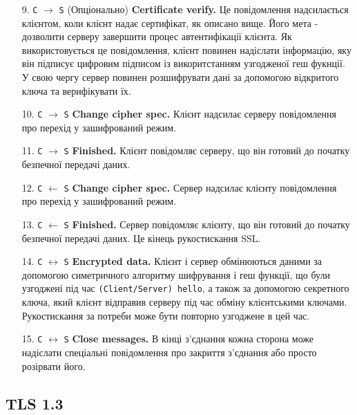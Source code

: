 \begin{enumerate}
    \item[9. \texttt{С} $\longrightarrow$ \texttt{S}] (Опціонально) \textbf{Certificate verify.} Це повідомлення надсилається клієнтом, коли клієнт надає сертифікат, як описано вище. Його мета - дозволити серверу завершити процес автентифікації клієнта. Як використовується це повідомлення, клієнт повинен надіслати інформацію, яку він підписує цифровим підписом із викоритстанням узгодженої геш фукнції. У свою чергу сервер повинен розшифрувати дані за допомогою відкритого ключа та верифікувати їх.
    \item[10. \texttt{С} $\longrightarrow$ \texttt{S}] \textbf{Change cipher spec.} Клієнт надсилає серверу повідомлення про перехід у зашифрований режим.
    \item[11. \texttt{С} $\longrightarrow$ \texttt{S}] \textbf{Finished.} Клієнт повідомляє серверу, що він готовий до початку безпечної передачі даних.
    \item[12. \texttt{С} $\longleftarrow$ \texttt{S}] \textbf{Change cipher spec.} Сервер надсилає клієнту повідомлення про перехід у зашифрований режим.
    \item[13. \texttt{С} $\longleftarrow$ \texttt{S}] \textbf{Finished.} Сервер повідомляє клієнту, що він готовий до початку безпечної передачі даних. Це кінець рукостискання SSL.
    \item[14. \texttt{С} $\longleftrightarrow$ \texttt{S}] \textbf{Encrypted data.} Клієнт і сервер обмінюються даними за допомогою симетричного алгоритму шифрування і  геш функції, що були узгоджені під час \texttt{(Client/Server) hello}, а також за допомогою секретного ключа, який клієнт відправив серверу під час обміну клієнтськими ключами. Рукостискання за потреби може бути повторно узгоджене в цей час.
    \item[15. \texttt{С} $\longleftrightarrow$ \texttt{S}] \textbf{Close messages.} В кінці з'єднання кожна сторона може надіслати спеціальні повідомлення про закриття з'єднання або просто розірвати його.
\end{enumerate}


\subsection{TLS 1.3}

